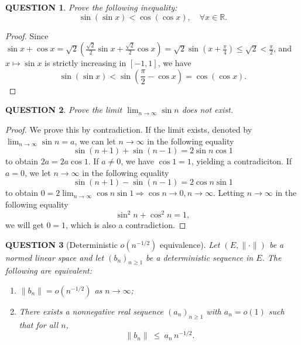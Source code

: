 \documentclass[12pt]{article}
\renewcommand{\(}{\left(}%
\renewcommand{\)}{\right)}%
\renewcommand{\[}{\left[}%
\renewcommand{\]}{\right]}%
\renewcommand{\r}{\mathbb{R}}
\newtheorem{question}{QUESTION}[section]}
\newtheorem{proof}{Proof.}}
\begin{document}
\begin{question}
	Prove the following inequality:
	\begin{equation*}
		\sin (\sin x)<\cos (\cos x),\quad \forall x\in\r.
	\end{equation*}
\end{question}
\begin{proof}
	Since $\sin x+\cos x=\sqrt{2}\(\frac{\sqrt{2}}{2}\sin x+\frac{\sqrt{2}}{2}\cos x\)=\sqrt{2}\sin \(x+\frac{\pi}{4}\)\leq \sqrt{2}<\frac{\pi}{2}$, and $x\mapsto \sin x$ is strictly increasing in $[-1,1]$, we have
	\begin{equation*}
		\sin (\sin x)<\sin \(\frac{\pi}{2}-\cos x\)=\cos (\cos x).
	\end{equation*}
\end{proof}

\begin{question}
	Prove the limit $\lim_{n\to \infty} \sin n $ does not exist.
\end{question}
\begin{proof}
	We prove this by contradiction. If the limit exists, denoted by $\lim_{n\to \infty} \sin n=a$, we can let $n\to\infty$ in the following equality 
	\begin{equation*}
		\sin (n+1)+\sin (n-1)=2\sin n\cos 1
	\end{equation*}
	to obtain $2a=2a\cos 1$. If $a\neq 0$, we have $\cos 1=1$, yielding a contradiciton. If $a=0$, we let $n\to \infty$ in the following equality
	\begin{equation*}
		\sin (n+1)-\sin (n-1)=2\cos n\sin 1
	\end{equation*}
	to obtain $0=2\lim_{n\to\infty}\cos n \sin 1\Longrightarrow \cos n\to 0,n\to\infty$. Letting $n\to\infty$ in the following equality 
	\begin{equation*}
		\sin^2 n+\cos^2 n =1,
	\end{equation*}
	we will get $0=1$, which is also a contradiction.
\end{proof}


\begin{question}[Deterministic $o(n^{-1/2})$ equivalence]
Let $(E,\|\cdot\|)$ be a normed linear space and let $(b_n)_{n\ge1}$ be a
\emph{deterministic} sequence in $E$. The following are equivalent:
\begin{enumerate}
\item $\|b_n\|=o(n^{-1/2})$ as $n\to\infty$;
\item There exists a nonnegative real sequence $(a_n)_{n\ge1}$ with $a_n=o(1)$
such that for all $n$,
\begin{equation*}
	\|b_n\|\ \le\ a_n\,n^{-1/2}.
\end{equation*}
\end{enumerate}
\end{question}
\end{document}
